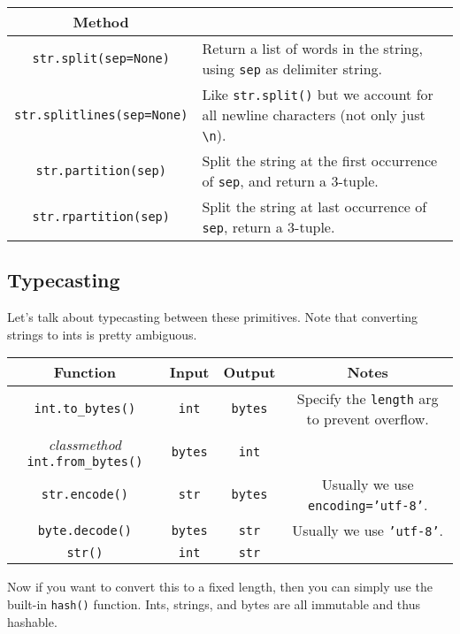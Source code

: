     \begin{definition}
      \begin{table}[H]
        \centering
        \begin{tabular}{|c|p{8cm}|}
          \hline
          \textbf{Method} & \textbf{} \\
          \hline
          \texttt{str.split(sep=None)} & Return a list of words in the string, using \texttt{sep} as delimiter string. \\ 
          \texttt{str.splitlines(sep=None)} & Like \texttt{str.split()} but we account for all newline characters (not only just \texttt{\textbackslash n}). \\ 
          \texttt{str.partition(sep)} & Split the string at the first occurrence of \texttt{sep}, and return a 3-tuple. \\ 
          \texttt{str.rpartition(sep)} & Split the string at last occurrence of \texttt{sep}, return a 3-tuple. \\  
          \hline
        \end{tabular}
      \end{table}
    \end{definition} 

\subsection{Typecasting}

  Let's talk about typecasting between these primitives. Note that converting strings to ints is pretty ambiguous. 

  \begin{table}[H]
    \centering
    \begin{tabular}{|c|c|c|c|}
      \hline
      \textbf{Function} & \textbf{Input} & \textbf{Output} & \textbf{Notes} \\
      \hline
      \texttt{int.to\_bytes()} & \texttt{int} & \texttt{bytes} & Specify the \texttt{length} arg to prevent overflow. \\ 
      \textit{classmethod} \texttt{int.from\_bytes()} & \texttt{bytes} & \texttt{int} & \\
      \texttt{str.encode()} & \texttt{str} & \texttt{bytes} & Usually we use \texttt{encoding='utf-8'}. \\  
      \texttt{byte.decode()} & \texttt{bytes} & \texttt{str} & Usually we use \texttt{'utf-8'}. \\  
      \texttt{str()} & \texttt{int} & \texttt{str} & \\ 
      \hline
    \end{tabular} 
  \end{table}

  Now if you want to convert this to a fixed length, then you can simply use the built-in \texttt{hash()} function. Ints, strings, and bytes are all immutable and thus hashable. 

